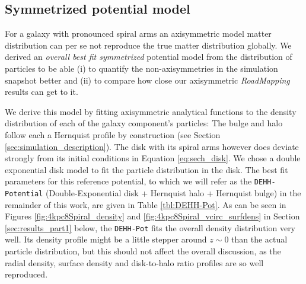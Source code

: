 \documentclass[iop,revtex4,numberedappendix,appendixfloats]{emulateapj}
\newcommand{\RM}{{\sl RoadMapping}}
\begin{document}
\subsection{Symmetrized potential model} \label{sec:DEHH-Pot}

For a galaxy with pronounced spiral arms an axisymmetric model matter distribution can per se not reproduce the true matter distribution globally. We derived an \emph{overall best fit symmetrized} potential model from the distribution of particles to be able (i) to quantify the non-axisymmetries in the simulation snapshot better and (ii) to compare how close our axisymmetric \RM{} results can get to it. 

We derive this model by fitting axisymmetric analytical functions to the density distribution of each of the galaxy component's particles: The bulge and halo follow each a Hernquist profile by construction (see Section \ref{sec:simulation_description}). The disk with its spiral arms however does deviate strongly from its initial conditions in Equation \ref{eq:sech_disk}. We chose a double exponential disk model to fit the particle distribution in the disk. The best fit parameters for this reference potential, to which we will refer as the \texttt{DEHH-Potential} (Double-Exponential disk + Hernquist halo + Hernquist bulge) in the remainder of this work, are given in Table \ref{tbl:DEHH-Pot}. As can be seen in Figures \ref{fig:4kpc8Spiral_density} and \ref{fig:4kpc8Spiral_vcirc_surfdens} in Section \ref{sec:results_part1} below, the \texttt{DEHH-Pot} fits the overall density distribution very well. Its density profile might be a little stepper around $z\sim 0$ than the actual particle distribution, but this should not affect the overall discussion, as the radial density, surface density and disk-to-halo ratio profiles are so well reproduced.

\end{document}
